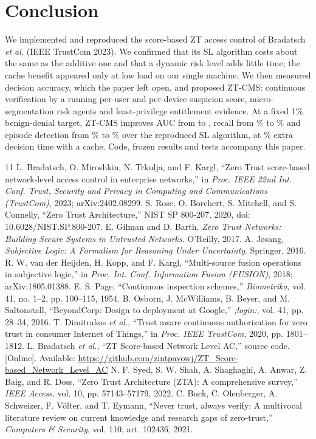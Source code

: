 \documentclass[conference,a4paper]{IEEEtran}
\begin{document}
\section{Conclusion}
We implemented and reproduced the score-based ZT access control of Bradatsch \emph{et al.} (IEEE TrustCom 2023). We confirmed that its SL algorithm costs about the same as the additive one and that a dynamic risk level adds little time; the cache benefit appeared only at low load on our single machine. We then measured decision accuracy, which the paper left open, and proposed ZT-CMS: continuous verification by a running per-user and per-device suspicion score, micro-segmentation risk agents and least-privilege entitlement evidence. At a fixed 1\% benign-denial target, ZT-CMS improves AUC from \AucSLD{} to \AucZ{}, recall from \RecSLD\% to \RecZ\% and episode detection from \EpSLD\% to \EpZ\% over the reproduced SL algorithm, at \ZvsSLDC\% extra decision time with a cache. Code, frozen results and tests accompany this paper.

\balance
\begin{thebibliography}{11}
 L. Bradatsch, O. Miroshkin, N. Trkulja, and F. Kargl, ``Zero Trust score-based network-level access control in enterprise networks,'' in \emph{Proc. IEEE 22nd Int. Conf. Trust, Security and Privacy in Computing and Communications (TrustCom)}, 2023; arXiv:2402.08299.
 S. Rose, O. Borchert, S. Mitchell, and S. Connelly, ``Zero Trust Architecture,'' NIST SP 800-207, 2020, doi: 10.6028/NIST.SP.800-207.
 E. Gilman and D. Barth, \emph{Zero Trust Networks: Building Secure Systems in Untrusted Networks}. O'Reilly, 2017.
 A. J{\o}sang, \emph{Subjective Logic: A Formalism for Reasoning Under Uncertainty}. Springer, 2016.
 R. W. van der Heijden, H. Kopp, and F. Kargl, ``Multi-source fusion operations in subjective logic,'' in \emph{Proc. Int. Conf. Information Fusion (FUSION)}, 2018; arXiv:1805.01388.
 E. S. Page, ``Continuous inspection schemes,'' \emph{Biometrika}, vol. 41, no. 1--2, pp. 100--115, 1954.
 B. Osborn, J. McWilliams, B. Beyer, and M. Saltonstall, ``BeyondCorp: Design to deployment at Google,'' \emph{;login:}, vol. 41, pp. 28--34, 2016.
 T. Dimitrakos \emph{et al.}, ``Trust aware continuous authorization for zero trust in consumer Internet of Things,'' in \emph{Proc. IEEE TrustCom}, 2020, pp. 1801--1812.
 L. Bradatsch \emph{et al.}, ``ZT Score-based Network Level AC,'' source code. [Online]. Available: \url{https://github.com/zintpavowj/ZT_Score-based_Network_Level_AC}
 N. F. Syed, S. W. Shah, A. Shaghaghi, A. Anwar, Z. Baig, and R. Doss, ``Zero Trust Architecture (ZTA): A comprehensive survey,'' \emph{IEEE Access}, vol. 10, pp. 57143--57179, 2022.
 C. Buck, C. Olenberger, A. Schweizer, F. V{\"o}lter, and T. Eymann, ``Never trust, always verify: A multivocal literature review on current knowledge and research gaps of zero-trust,'' \emph{Computers \& Security}, vol. 110, art. 102436, 2021.
\end{thebibliography}
\end{document}
